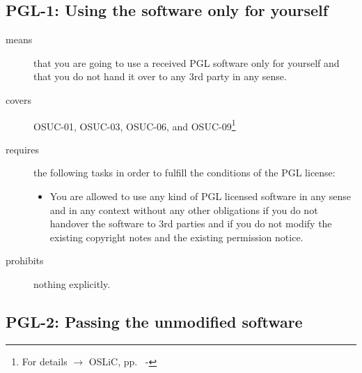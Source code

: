 \begin{center}
\begin{footnotesize}
{{{{{        }
      }
    }
   }   
}
\end{footnotesize}
\end{center}

\subsection{PGL-1: Using the software only for yourself}
\label{OSUC-01-PGL} 
\label{OSUC-03-PGL} 
\label{OSUC-06-PGL}
\label{OSUC-09-PGL}
  
\begin{description}

\item[means] that you are going to use a received PGL software only for yourself
and that you do not hand it over to any 3rd party in any sense.

\item[covers] OSUC-01, OSUC-03, OSUC-06, and OSUC-09\footnote{For details
$\rightarrow$ OSLiC, pp.\ \pageref{OSUC-01-DEF} - \pageref{OSUC-09-DEF}}

\item[requires] the following tasks in order to fulfill the conditions of the
PGL license:
  \begin{itemize}
    \item You are allowed to use any kind of PGL licensed software in any sense
    and in any context without any other obligations if you do not handover the
    software to 3rd parties and if you do not modify the existing copyright
    notes and the existing permission notice.
  \end{itemize}

\item[prohibits] nothing explicitly.

\end{description}

\subsection{PGL-2: Passing the unmodified software}
\label{OSUC-02S-PGL} \label{OSUC-05S-PGL} \label{OSUC-07S-PGL} 
\label{OSUC-02B-PGL} \label{OSUC-05B-PGL} \label{OSUC-07B-PGL} 

